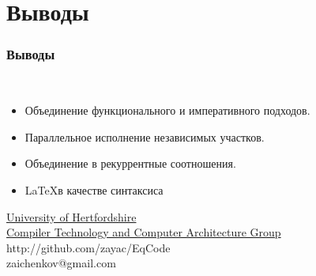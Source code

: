 \documentclass{beamer}
\begin{document}
\section{Выводы}
\begin{frame}
\frametitle{Выводы}
\begin{exampleblock}{\ }
	\begin{itemize}
		\item Объединение функционального и императивного подходов.
		\item Параллельное исполнение независимых участков.
		\item Объединение в рекуррентные соотношения.
		\item \LaTeX в качестве синтаксиса
	\end{itemize}
\end{exampleblock}
\end{frame}
\begin{frame}
	\centering \underline{University of Hertfordshire} \\
	\centering \underline{Compiler Technology and Computer Architecture Group} \\	
	
	\centering http://github.com/zayac/EqCode \\
	\centering zaichenkov@gmail.com \\
\end{frame}
\end{document}
